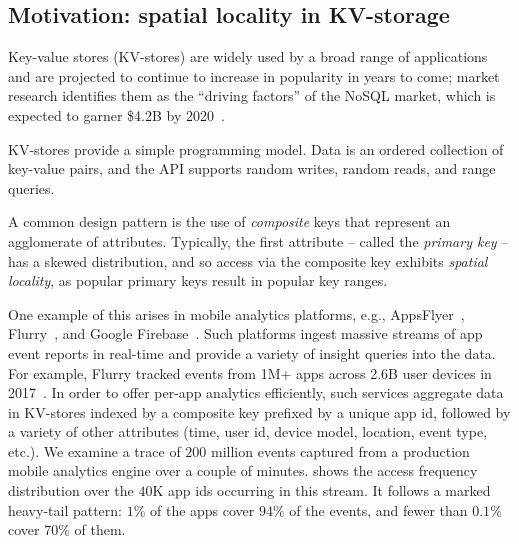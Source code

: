 \subsection{Motivation:  spatial locality in KV-storage}

Key-value stores (KV-stores) are widely used  by a broad range of applications and are projected
to continue to increase in popularity in years to come; market research  identifies them as the 
``driving factors'' of the NoSQL market, which is expected to garner \$4.2B by 2020~\cite{alliedmarketresearch}.

KV-stores provide a simple programming model. 
Data is an ordered collection of key-value pairs, and the API supports random writes, 
random reads, and range queries. 

A common design pattern is the use of \emph{composite} keys that represent an agglomerate of attributes.
Typically, the first attribute -- called the \emph{primary key} -- has a skewed distribution, and so   access via the composite key exhibits \emph{spatial locality}, as 
popular primary keys result in popular key ranges. 

One example of this arises in mobile analytics platforms, e.g., AppsFlyer~\cite{appsflyer}, Flurry~\cite{flurry}, 
and Google Firebase~\cite{firebase}. %
Such platforms %
ingest massive streams of app event reports %
in  real-time and provide a variety of insight queries into the data. For example, Flurry tracked events from  
1M+ apps across 2.6B user devices  in 2017~\cite{FlurryReport2017}. In order to offer per-app analytics efficiently,
such services aggregate data in KV-stores indexed by a composite key prefixed by a unique app 
id,  followed by a variety of other attributes (time, user id, device model, location, event type, etc.).
%
We examine a trace of $200$ million events captured from a production mobile analytics engine over a couple of minutes.  
 shows the access frequency distribution over the  $40$K app ids occurring in this stream. It follows a marked
heavy-tail pattern: 
$1$\% of the apps  cover $94$\% of the events, and fewer 
than $0.1$\% cover $70$\% of them. 

